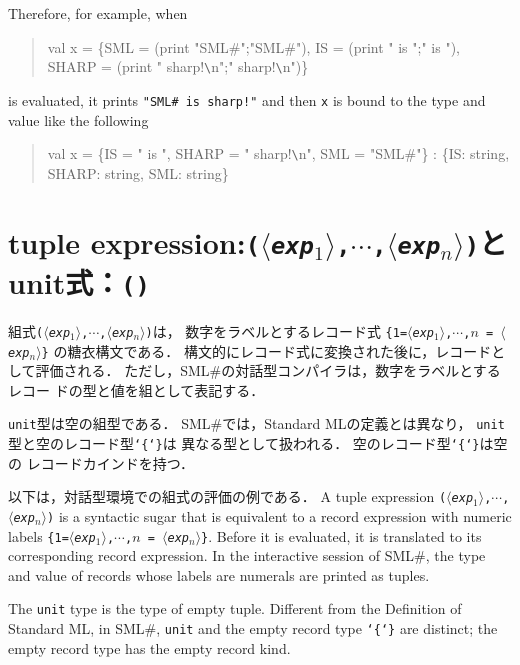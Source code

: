\documentclass{jbook}
\newcommand{\txt}[2]{#2}
\newcommand{\smlsharp}{SML\#}
\newcommand{\code}[1]{\mbox{\large\tt #1}}
\newcommand{\nonterm}[1]{\mbox{$\langle$}{\it #1}\mbox{$\rangle$}}
\newcommand{\term}[1]{\mbox{{\tt #1}}}
\newenvironment{program}{\begin{quote}\begin{tt}}%
                        {\end{tt}\end{quote}}
\begin{document}
	Therefore, for example, when
\begin{program}
val x = \{SML = (print "SML\#";"SML\#"), 
          IS = (print " is ";" is "),
          SHARP = (print " sharp!\verb|\|n";" sharp!\verb|\|n")\}
\end{program}
is evaluated,
it prints \code{"SML\# is sharp!"} and then
\code{x} is bound to the type and value like the following
\begin{program}
val x = \{IS = " is ", SHARP = " sharp!\verb|\|n", SML = "SML\#"\} : \{IS: string, SHARP: string, SML: string\}
\end{program}

\fi%


\section{\txt{組式}{tuple expression}:\term{(\nonterm{exp$_1$},$\cdots$,\nonterm{exp$_n$})}とunit式：\term{()}}

\ifjp%
	組式\term{(\nonterm{exp$_1$},$\cdots$,\nonterm{exp$_n$})}は，
数字をラベルとするレコード式
\term{\{1=\nonterm{exp$_1$},$\cdots$,$n$ = \nonterm{exp$_n$}\}}
の糖衣構文である．
	構文的にレコード式に変換された後に，レコードとして評価される．
	ただし，\smlsharp{}の対話型コンパイラは，数字をラベルとするレコー
ドの型と値を組として表記する．

	\code{unit}型は空の組型である．
	\smlsharp{}では，Standard MLの定義とは異なり，
\code{unit}型と空のレコード型\code{\char`\{\char`\}}は
異なる型として扱われる．
	空のレコード型\code{\char`\{\char`\}}は空の
レコードカインドを持つ．

	以下は，対話型環境での組式の評価の例である．
\else%
	A tuple expression
\term{(\nonterm{exp$_1$},$\cdots$,\nonterm{exp$_n$})} is a
syntactic sugar that is equivalent to
a record expression with numeric labels
\term{\{1=\nonterm{exp$_1$},$\cdots$,$n$ = \nonterm{exp$_n$}\}}.
	Before it is evaluated,
it is translated to its corresponding record expression.
	In the interactive session of \smlsharp{},
the type and value of records whose labels are numerals are printed
as tuples.

	The \code{unit} type is the type of empty tuple.
	Different from the Definition of Standard ML,
in \smlsharp{}, \code{unit} and the empty record type
\code{\char`\{\char`\}} are distinct;
the empty record type has the empty record kind.
\end{document}
